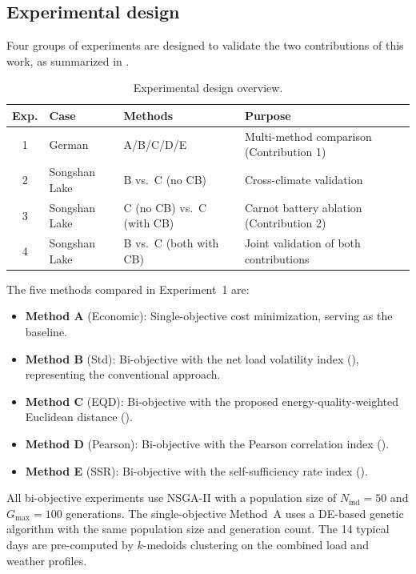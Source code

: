 \subsection{Experimental design}
\label{sec:exp_design}

Four groups of experiments are designed to validate the two contributions of this work, as summarized in .

\begin{table}[htbp]
\centering
\caption{Experimental design overview.}
\label{tab:experiments}
\small
\begin{tabular}{@{}cllp{5.5cm}@{}}
\toprule
Exp. & Case & Methods & Purpose \\
\midrule
1 & German & A/B/C/D/E & Multi-method comparison (Contribution 1) \\
2 & Songshan Lake & B vs.\ C (no CB) & Cross-climate validation \\
3 & Songshan Lake & C (no CB) vs.\ C (with CB) & Carnot battery ablation (Contribution 2) \\
4 & Songshan Lake & B vs.\ C (both with CB) & Joint validation of both contributions \\
\bottomrule
\end{tabular}
\end{table}

The five methods compared in Experiment~1 are:
\begin{itemize}
    \item \textbf{Method A} (Economic): Single-objective cost minimization, serving as the baseline.
    \item \textbf{Method B} (Std): Bi-objective with the net load volatility index (), representing the conventional approach.
    \item \textbf{Method C} (EQD): Bi-objective with the proposed energy-quality-weighted Euclidean distance ().
    \item \textbf{Method D} (Pearson): Bi-objective with the Pearson correlation index ().
    \item \textbf{Method E} (SSR): Bi-objective with the self-sufficiency rate index ().
\end{itemize}

All bi-objective experiments use NSGA-II with a population size of $N_{\text{ind}} = 50$ and $G_{\text{max}} = 100$ generations. The single-objective Method~A uses a DE-based genetic algorithm with the same population size and generation count. The 14 typical days are pre-computed by $k$-medoids clustering on the combined load and weather profiles.
